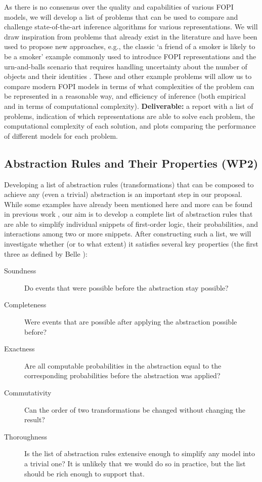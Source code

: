 \documentclass[11pt,english,twocolumn]{article}
\begin{document}
As there is no consensus over the quality and capabilities of various
FOPI models, we will develop a list of problems that can be used to compare and
challenge state-of-the-art inference algorithms for various representations. We
will draw inspiration from problems that already exist in the literature and
have been used to propose new approaches, e.g., the classic `a friend of a
smoker is likely to be a smoker' example commonly used to introduce FOPI
representations
\cite{DBLP:series/sci/BrazAR08,DBLP:conf/ijcai/BroeckTMDR11,DBLP:journals/ml/RichardsonD06,DBLP:journals/cib/Venugopal17}
and the urn-and-balls scenario that requires handling uncertainty about the
number of objects and their identities \cite{DBLP:conf/ijcai/MilchMRSOK05}.
These and other example problems will allow us to compare modern FOPI models
in terms of what complexities of the problem can be represented in a reasonable
way, and efficiency of inference (both empirical and in terms of computational
complexity). \textbf{Deliverable:} a report with a list of problems, indication of
which representations are able to solve each problem, the computational
complexity of each solution, and plots comparing the performance of different
models for each problem.

\subsection*{Abstraction Rules and Their Properties (WP2)}

Developing a list of abstraction rules (transformations) that can be composed to
achieve any (even a trivial) abstraction is an important step in our proposal.
While some examples have already been mentioned here and more can be found in
previous work
\cite{DBLP:journals/corr/abs-1810-02434,DBLP:journals/ai/GiunchigliaW92,DBLP:conf/uai/HoltzenMB17,saitta2013abstraction},
our aim is to develop a complete list of abstraction rules that are able to
simplify individual snippets of first-order logic, their probabilities, and
interactions among two or more snippets. After constructing such a list, we will
investigate whether (or to what extent) it satisfies several key properties (the
first three as defined by Belle \cite{DBLP:journals/corr/abs-1810-02434}):

\begin{description}
\item[Soundness] Do events that were possible before the abstraction stay
  possible?
\item[Completeness] Were events that are possible after applying the abstraction
  possible before?
\item[Exactness] Are all computable probabilities in the abstraction equal to
  the corresponding probabilities before the abstraction was applied?
\item[Commutativity] Can the order of two transformations be changed without
  changing the result?
\item[Thoroughness] Is the list of abstraction rules extensive enough to
  simplify any model into a trivial one? It is unlikely that we would do so in
  practice, but the list should be rich enough to support that.
\end{description}
\end{document}
